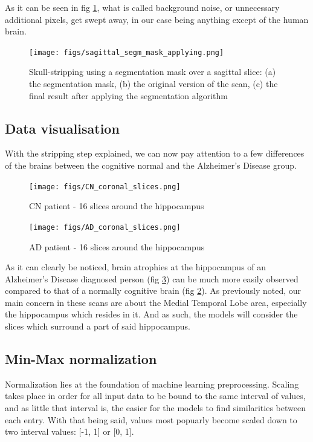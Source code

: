 \documentclass[a4paper, 12pt]{article}
\begin{document}
As it can be seen in fig \ref{fig:segm-mask}, what is called background noise, or unnecessary additional pixels, get
swept away, in our case being anything except of the human brain.


\begin{figure}[htbp]
    \centering
    \texttt{[image: figs/sagittal\_segm\_mask\_applying.png]}
    \caption{Skull-stripping using a segmentation mask over a sagittal slice: (a) the segmentation mask, (b) the
        original version of the scan, (c) the final result after applying the segmentation algorithm
    }
    \label{fig:segm-mask}
\end{figure}

\subsection{Data visualisation}
With the stripping step explained, we can now pay attention to a few differences of the brains between the cognitive normal
and the Alzheimer's Disease group.

\begin{figure}[htbp]
    \centering
    \texttt{[image: figs/CN\_coronal\_slices.png]}
    \caption{CN patient - 16 slices around the hippocampus}
    \label{fig:CN_coronal_slices}
\end{figure}

\begin{figure}[htbp]
    \centering
    \texttt{[image: figs/AD\_coronal\_slices.png]}
    \caption{AD patient - 16 slices around the hippocampus}
    \label{fig:AD_coronal_slices}
\end{figure}

As it can clearly be noticed, brain atrophies at the hippocampus of an Alzheimer's Disease diagnosed person (fig \ref{fig:AD_coronal_slices})
can be much more easily observed compared to that of a normally cognitive brain (fig \ref{fig:CN_coronal_slices}). As previously noted,
our main concern in these scans are about the Medial Temporal Lobe area, especially the hippocampus which resides in it. And as such,
the models will consider the slices which surround a part of said hippocampus.

\subsection{Min-Max normalization}
Normalization lies at the foundation of machine learning preprocessing. Scaling takes place in order for all input data to be bound to the same
interval of values, and as little that interval is, the easier for the models to find similarities between each entry. With that being said, values
most popuarly become scaled down to two interval values: [-1, 1] or [0, 1].
\end{document}
